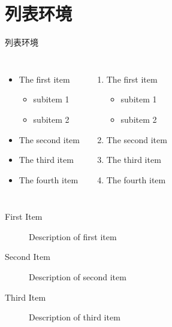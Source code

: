 \documentclass[compress,10pt,dvipsnames,notheorems]{beamer} %
\begin{document}
\section{列表环境}%
\begin{frame}{列表环境} %
	\begin{columns}
		\begin{itemize}
			\item The first item
			\begin{itemize}
				\item subitem 1
				\item subitem 2
			\end{itemize}
			\item The second item
			\item The third item
			\item The fourth item
		\end{itemize}
		
		\begin{enumerate}
			\item The first item
			\begin{itemize}
				\item subitem 1
				\item subitem 2
			\end{itemize}
			\item The second item
			\item The third item
			\item The fourth item
		\end{enumerate}
	\end{columns}\vspace{2em}

	\begin{description}
		\item[First Item] Description of first item
		\item[Second Item] Description of second item
		\item[Third Item] Description of third item
	\end{description}
\end{frame}
\end{document}
